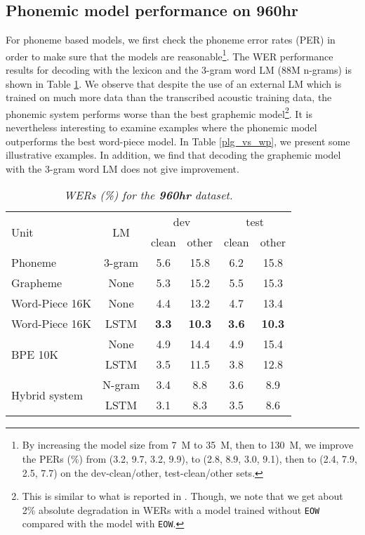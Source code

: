 \subsection{Phonemic model performance on 960hr}
		\vspace{-1mm}
For phoneme based models, we first check the phoneme error rates (PER) in order to make
sure that the models are reasonable\footnote{By increasing the model size from 7~M to 35~M, then to 130~M, we improve
the PERs (\%) from (3.2, 9.7, 3.2, 9.9), to (2.8, 8.9, 3.0, 9.1), then to  (2.4, 7.9, 2.5, 7.7) on the 
dev-clean/other, test-clean/other sets.}.
The WER performance results for decoding with the
lexicon and the 3-gram word LM (88M n-grams) is shown in Table \ref{960overview}.
We observe that despite the use of an external LM
which is trained on much more data than the transcribed acoustic training data, the phonemic system performs worse
than the best graphemic model\footnote{This is similar to what is reported in \cite{sainath2017no}. Though, we note that we get about 2\% absolute degradation in WERs
with a model trained without \texttt{EOW} compared with the model with \texttt{EOW}.}.
It is nevertheless interesting to examine examples where the phonemic model outperforms the best word-piece
model. In Table \ref{plg_vs_wp}, we present some illustrative examples.
In addition, we find that decoding the graphemic model with the 3-gram word LM does not give improvement.
\begin{table}[h]
	\centering
	\setlength{\tabcolsep}{0.5em}
	\vspace{-2mm}
	\caption{\it WERs (\%) for the \textbf{960hr} dataset.}
	\vspace{-4mm}
	\label{960overview}
	\begin{tabular}{ |l|c|c|c|c|c|} \hline
		\multirow{2}{*}{Unit} & \multirow{2}{*}{LM} & \multicolumn{2}{|c|}{dev} & \multicolumn{2}{|c|}{test}    \\ \cline{3-6}
		& & clean & other & clean & other    \\ \hline
		Phoneme      & 3-gram & 5.6 & 15.8 & 6.2 & 15.8  \\
		Grapheme     & None & 5.3 & 15.2 & 5.5 & 15.3  \\ 
		Word-Piece 16K & None & 4.4 & 13.2 & 4.7 & 13.4 \\ \hline
		Word-Piece 16K & LSTM & \textbf{3.3} & \textbf{10.3} & \textbf{3.6} & \textbf{10.3}  \\ \hline \hline
		\multirow{2}{*}{BPE 10K \cite{zeyer2018:asr-attention}} & None & 4.9 & 14.4 & 4.9 & 15.4 \\
		& LSTM & 3.5 & 11.5 & 3.8 & 12.8 \\ \hline
		\multirow{2}{*}{Hybrid system \cite{han2017capio}}  & N-gram & 3.4 & 8.8 & 3.6 & 8.9 \\
		& LSTM & 3.1 & 8.3 & 3.5 & 8.6 \\ \hline 
	\end{tabular}
	\vspace{-4mm}
\end{table}
